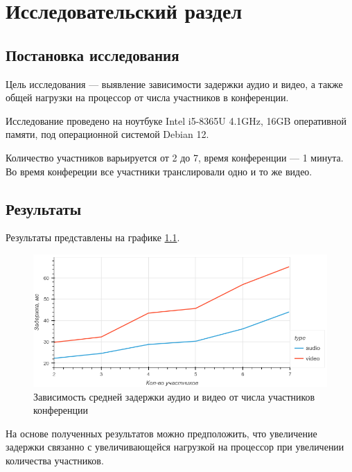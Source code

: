 \chapter{Исследовательский раздел}

\section{Постановка исследования}

Цель исследования --- выявление зависимости задержки аудио и видео, а также общей нагрузки на процессор от числа участников в конференции.

Исследование проведено на ноутбуке Intel i5-8365U 4.1GHz, 16GB оперативной памяти, под операционной системой Debian 12.

Количество участников варьируется от 2 до 7, время конференции --- 1 минута. Во время конфереции все участники транслировали одно и то же видео.

\section{Результаты}

Результаты представлены на графике \ref{img:latency}.

\begin{figure}[h!]
  \centering
  \includegraphics[width=\linewidth]{inc/img/latency.png}
  \caption{Зависимость средней задержки аудио и видео от числа участников конференции}
  \label{img:latency}
\end{figure}

На основе полученных результатов можно предположить, что увеличение задержки связанно с  увеличивающейся нагрузкой на процессор при увеличении количества участников.

